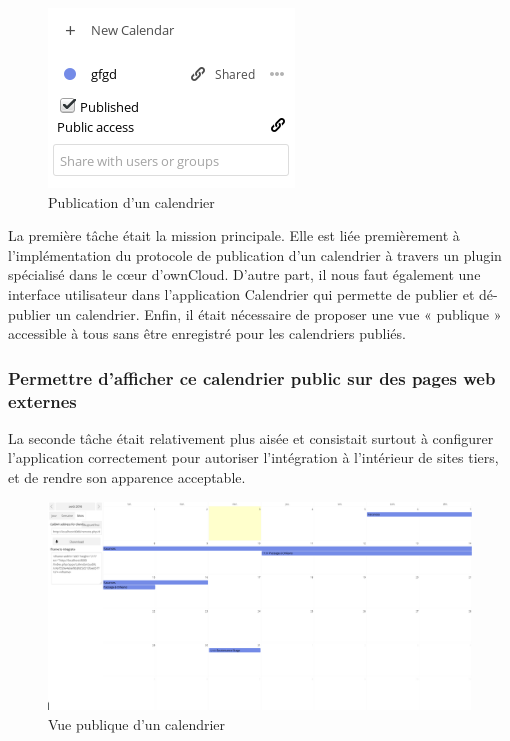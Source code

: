 \documentclass[10pt,a4paper]{report}
\begin{document}
	\begin{figure}
		\begin{center}
		\includegraphics[width=0.3\paperwidth]{images/fonctionnalitepublie.png}
	\end{center}
		\caption{Publication d'un calendrier}
	\end{figure}
	
	La première tâche était la mission principale. Elle est liée premièrement à l'implémentation du protocole de publication d'un calendrier à travers un plugin spécialisé dans le cœur d'ownCloud. D'autre part, il nous faut également une interface utilisateur dans l'application Calendrier qui permette de publier et dé-publier un calendrier. Enfin, il était nécessaire de proposer une vue « publique » accessible à tous sans être enregistré pour les calendriers publiés.

	
	\subsubsection{Permettre d'afficher ce calendrier public sur des pages web externes}La seconde tâche était relativement plus aisée et consistait surtout à configurer l'application correctement pour autoriser l'intégration à l'intérieur de sites tiers, et de rendre son apparence acceptable.
	
	\begin{figure}[ht]
		\centering
		\centerline{\includegraphics[width=1.5\textwidth]{images/calendrier-vue-publique.png}}
		\caption*{Vue publique d'un calendrier}
		\label{normal_case}
	\end{figure}
	
\end{document}
